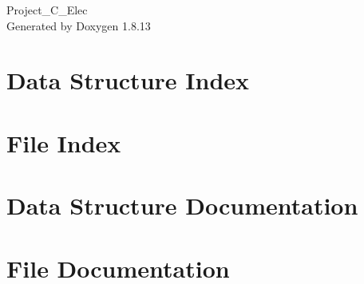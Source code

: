 \documentclass[twoside]{book}
\newcommand{\+}{\discretionary{\mbox{\scriptsize$\hookleftarrow$}}{}{}}
\newcommand{\clearemptydoublepage}{%
  \newpage{\pagestyle{empty}\cleardoublepage}%
}
\begin{document}
\hypersetup{pageanchor=false,
             bookmarksnumbered=true,
             pdfencoding=unicode
            }
\begin{titlepage}
\vspace*{7cm}
\begin{center}%
{\Large Project\+\_\+\+C\+\_\+\+Elec }\\
\vspace*{1cm}
{\large Generated by Doxygen 1.8.13}\\
\end{center}
\end{titlepage}
\clearemptydoublepage
{}
\tableofcontents
\clearemptydoublepage
{}
\hypersetup{pageanchor=true}

\chapter{Data Structure Index}

\chapter{File Index}

\chapter{Data Structure Documentation}









\chapter{File Documentation}



\backmatter
\newpage
{}
\clearemptydoublepage
{}
\printindex
\end{document}
